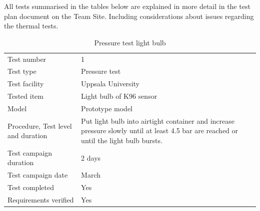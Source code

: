 All tests summarised in the tables below are explained in more detail in the test plan document on the Team Site. Including considerations about issues regarding the thermal tests.
\begin{table}[H]
\centering
\caption{Pressure test light bulb}
\label{tab:test_pressure_light_bulb}
\begin{tabular}{L{5cm}L{10cm}}
\toprule
Test number & 1 \\
Test type & Pressure test \\
Test facility & Uppsala University \\
Tested item & Light bulb of K96 sensor \\
Model & Prototype model \\
Procedure, Test level and duration & Put light bulb into airtight container and increase pressure slowly until at least 4.5 bar are reached or until the light bulb bursts. \\
Test campaign duration & 2 days \\
Test campaign date & March \\
Test completed & Yes \\
Requirements verified & Yes\\
\bottomrule
\end{tabular}
\end{table}

